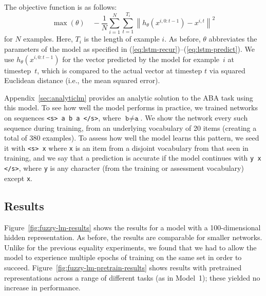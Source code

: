 \documentclass{article}
\newcommand{\Figref}[1]{Figure~\ref{#1}}
\newcommand{\figref}[1]{Figure~\ref{#1}}
\newcommand{\Appref}[1]{Appendix~\ref{#1}}
\newcommand{\eg}[1]{(\ref{#1})}
\newcommand{\dasheg}[2]{\eg{#1}--\eg{#2}}
\newcommand{\update}[1]{#1}
\begin{document}
The objective function is as follows:
%
\begin{equation}
\max(\theta)
\quad
-\frac{1}{N}
\sum_{i=1}^{N}
\sum_{t=1}^{T_{i}}
\left\| h_{\theta}\left(x^{i, 0:{t-1}}\right) - x^{i,t} \right\|^{2}
\end{equation}
%
for $N$ examples. Here, $T_{i}$ is the length of example $i$. As before, $\theta$ abbreviates the parameters of the model as specified in \dasheg{eq:lstm-recur}{eq:lstm-predict}. We use $h_{\theta}(x^{i, 0:{t-1}})$ for the vector predicted by the model for example~$i$ at timestep~$t$, which is compared to the actual vector at timestep $t$ via squared Euclidean distance (i.e., the mean squared error).


\Appref{sec:analyticlm} provides an analytic solution to the ABA task using this model. To see how well the model performs in practice, we trained networks on sequences \texttt{<s> a b a </s>}, where $\texttt{b} \neq \texttt{a}$. We show the network every such sequence during training, from an underlying vocabulary of 20 items (creating a total of 380 examples). To assess how well the model learns this pattern, we seed it with \texttt{<s> x} where \texttt{x} is an item from a disjoint vocabulary from that seen in training, and we say that a prediction is accurate if the model continues with \texttt{y x </s>}, where \texttt{y} is any character (from the training or assessment vocabulary) except \texttt{x}.

\subsection{Results}

\Figref{fig:fuzzy-lm-results} shows the results for a model with a 100-dimensional hidden representation. As before, the results are comparable for smaller networks. Unlike for the previous equality experiments, we found that we had to allow the model to experience multiple epochs of training on the same set in order to succeed. \figref{fig:fuzzy-lm-pretrain-results} shows results with pretrained representations across a range of different tasks (as in Model~1); these yielded no increase in performance.
\end{document}
